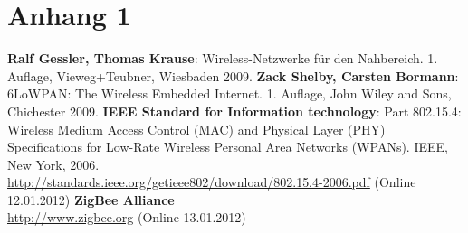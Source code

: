 \appendix

\section{Anhang 1}

\listoffigures

\listoftables

\lstlistoflistings

\printglossary

\begin{thebibliography}{}
   \textbf{Ralf Gessler, Thomas Krause}: Wireless-Netzwerke für den Nahbereich. 1.  Auflage, Vieweg+Teubner, Wiesbaden 2009.
   \textbf{Zack Shelby, Carsten Bormann}: 6LoWPAN: The Wireless Embedded Internet. 1.  Auflage, John Wiley and Sons, Chichester 2009.
   \textbf{IEEE Standard for Information technology}: Part 802.15.4: Wireless Medium Access Control (MAC) and Physical Layer (PHY) Specifications for Low-Rate Wireless Personal Area Networks (WPANs). IEEE, New York, 2006.\\
\url{http://standards.ieee.org/getieee802/download/802.15.4-2006.pdf} (Online 12.01.2012)
   \textbf{ZigBee Alliance}\\
\url{http://www.zigbee.org} (Online 13.01.2012)
\end{thebibliography}
